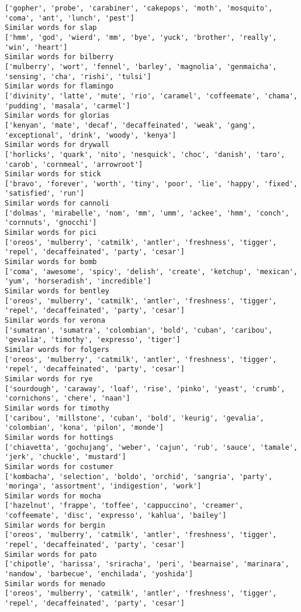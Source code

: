 \documentclass[11pt]{article}
\begin{document}
\begin{Verbatim}[commandchars=\\\{\}]
['gopher', 'probe', 'carabiner', 'cakepops', 'moth', 'mosquito', 'coma', 'ant', 'lunch', 'pest']
Similar words for slap
['hmm', 'god', 'wierd', 'mm', 'bye', 'yuck', 'brother', 'really', 'win', 'heart']
Similar words for bilberry
['mulberry', 'wort', 'fennel', 'barley', 'magnolia', 'genmaicha', 'sensing', 'cha', 'rishi', 'tulsi']
Similar words for flamingo
['divinity', 'latte', 'mute', 'rio', 'caramel', 'coffeemate', 'chama', 'pudding', 'masala', 'carmel']
Similar words for glorias
['kenyan', 'mate', 'decaf', 'decaffeinated', 'weak', 'gang', 'exceptional', 'drink', 'woody', 'kenya']
Similar words for drywall
['horlicks', 'quark', 'nito', 'nesquick', 'choc', 'danish', 'taro', 'carob', 'cornmeal', 'arrowroot']
Similar words for stick
['bravo', 'forever', 'worth', 'tiny', 'poor', 'lie', 'happy', 'fixed', 'satisfied', 'run']
Similar words for cannoli
['dolmas', 'mirabelle', 'nom', 'mm', 'umm', 'ackee', 'hmm', 'conch', 'cornnuts', 'gnocchi']
Similar words for pici
['oreos', 'mulberry', 'catmilk', 'antler', 'freshness', 'tigger', 'repel', 'decaffeinated', 'party', 'cesar']
Similar words for bomb
['coma', 'awesome', 'spicy', 'delish', 'create', 'ketchup', 'mexican', 'yum', 'horseradish', 'incredible']
Similar words for bentley
['oreos', 'mulberry', 'catmilk', 'antler', 'freshness', 'tigger', 'repel', 'decaffeinated', 'party', 'cesar']
Similar words for verona
['sumatran', 'sumatra', 'colombian', 'bold', 'cuban', 'caribou', 'gevalia', 'timothy', 'expresso', 'tiger']
Similar words for folgers
['oreos', 'mulberry', 'catmilk', 'antler', 'freshness', 'tigger', 'repel', 'decaffeinated', 'party', 'cesar']
Similar words for rye
['sourdough', 'caraway', 'loaf', 'rise', 'pinko', 'yeast', 'crumb', 'cornichons', 'chere', 'naan']
Similar words for timothy
['caribou', 'millstone', 'cuban', 'bold', 'keurig', 'gevalia', 'colombian', 'kona', 'pilon', 'monde']
Similar words for hottings
['chiavetta', 'gochujang', 'weber', 'cajun', 'rub', 'sauce', 'tamale', 'jerk', 'chuckle', 'mustard']
Similar words for costumer
['kombacha', 'selection', 'boldo', 'orchid', 'sangria', 'party', 'moringa', 'assortment', 'indigestion', 'work']
Similar words for mocha
['hazelnut', 'frappe', 'toffee', 'cappuccino', 'creamer', 'coffeemate', 'disc', 'expresso', 'kahlua', 'bailey']
Similar words for bergin
['oreos', 'mulberry', 'catmilk', 'antler', 'freshness', 'tigger', 'repel', 'decaffeinated', 'party', 'cesar']
Similar words for pato
['chipotle', 'harissa', 'sriracha', 'peri', 'bearnaise', 'marinara', 'nandow', 'barbecue', 'enchilada', 'yoshida']
Similar words for menado
['oreos', 'mulberry', 'catmilk', 'antler', 'freshness', 'tigger', 'repel', 'decaffeinated', 'party', 'cesar']

\end{Verbatim}
\end{document}
